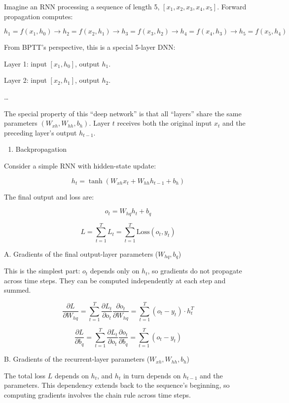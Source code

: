 Imagine an RNN processing a sequence of length 5, \([x_1,x_2,x_3,x_4,x_5]\). Forward propagation computes:

\[
h_1=f(x_1,h_0)\to h_2=f(x_2,h_1)\to h_3=f(x_3,h_2)\to h_4=f(x_4,h_3)\to h_5=f(x_5,h_4)
\]

From BPTT's perspective, this is a special 5-layer DNN:

Layer 1: input \([x_1,h_0]\), output \(h_1\).

Layer 2: input \([x_2,h_1]\), output \(h_2\).

\ldots{}

The special property of this ``deep network'' is that all ``layers'' share the same parameters \((W_{xh}, W_{hh}, b_h)\). Layer \(t\) receives both the original input \(x_t\) and the preceding layer's output \(h_{t-1}\).

\begin{enumerate}
\def\labelenumi{(\arabic{enumi})}
\setcounter{enumi}{1}
\tightlist
\item
  Backpropagation
\end{enumerate}

Consider a simple RNN with hidden-state update:

\[
h_t = \tanh(W_{xh}x_t + W_{hh}h_{t-1} + b_h)
\]

The final output and loss are:

\[
o_t = W_{hq}h_t + b_q
\]

\[
L = \sum_{t=1}^{T} L_t = \sum_{t=1}^{T} \mathrm{Loss}(o_t, y_t)
\]

A. Gradients of the final output-layer parameters (\(W_{hq}, b_q\))

This is the simplest part: \(o_t\) depends only on \(h_t\), so gradients do not propagate across time steps. They can be computed independently at each step and summed.

\[
\frac{\partial L}{\partial W_{hq}}
= \sum_{t=1}^{T} \frac{\partial L_t}{\partial o_t}\frac{\partial o_t}{\partial W_{hq}}
= \sum_{t=1}^{T}(o_t - y_t) \cdot h_t^T
\]

\[
\frac{\partial L}{\partial b_q}
= \sum_{t=1}^{T} \frac{\partial L_t}{\partial o_t}\frac{\partial o_t}{\partial b_q}
= \sum_{t=1}^{T}(o_t - y_t)
\]

B. Gradients of the recurrent-layer parameters (\(W_{xh}, W_{hh}, b_h\))

The total loss \(L\) depends on \(h_t\), and \(h_t\) in turn depends on \(h_{t-1}\) and the parameters. This dependency extends back to the sequence's beginning, so computing gradients involves the chain rule across time steps.

